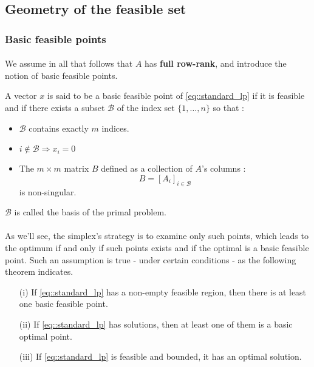 \documentclass[a4paper]{article}
\newcommand\reflp{\eqref{eq::standard_lp}}
\begin{document}
{{{				
			}
		}
		\subsection{Geometry of the feasible set}
		{
			\subsubsection{Basic feasible points}
			{
			\paragraph{} We assume in all that follows that $A$ has \textbf{full row-rank}, and introduce the notion of basic feasible points. 
			\vspace{10pt}
			
			{
				A vector $x$ is said to be a basic feasible point of \eqref{eq::standard_lp} if it is feasible and if there exists a subset $\mathcal{B}$ of the index set $\{1,\hdots,n\}$ so that : 
				\begin{itemize}
					\item $\mathcal{B}$ contains exactly $m$ indices. 
					\item $i\notin \mathcal{B} \Rightarrow x_i = 0$
					\item The $m\times m$ matrix $B$ defined as a collection of $A$'s columns : 
					$$
						B = [A_i]_{i\in\mathcal{B}}
					$$
					is non-singular.  
				\end{itemize}
			}
			\vspace{5pt}
			
			\noindent$\mathcal{B}$ is called the basis of the primal problem. 
				
				\paragraph{} As we'll see, the simplex's strategy is to examine only such points, which leads to the optimum if and only if such points exists and if the optimal is a basic feasible point. Such an assumption is true - under certain conditions - as the following theorem indicates. 
				\vspace{10pt}
				
				{
					\begin{itemize}
						\item[(i)] If \reflp{} has a non-empty feasible region, then there is at least one basic feasible point. 
						\item[(ii)] If \reflp{} has solutions, then at least one of them is a basic optimal point. 
						\item[(iii)] If \reflp{} is feasible and bounded, it has an optimal solution. 
					\end{itemize}
				}			 
				\vspace{10pt}
				
}}}
\end{document}

